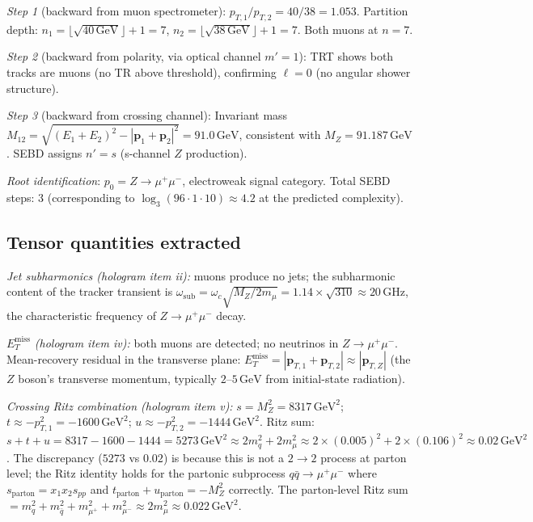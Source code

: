 \documentclass[twocolumn,10pt,a4paper]{article}
\theoremstyle{thmstyle}
\theoremstyle{definition}
\theoremstyle{remark}
\newcommand{\ETmiss}{E_{T}^{\mathrm{miss}}}
\begin{document}
\emph{Step 1} (backward from muon spectrometer):
$p_{T,1}/p_{T,2} = 40/38 = 1.053$.
Partition depth: $n_1 = \lfloor\sqrt{40\,\mathrm{GeV}}\rfloor + 1 = 7$,
$n_2 = \lfloor\sqrt{38\,\mathrm{GeV}}\rfloor + 1 = 7$.
Both muons at $n = 7$.

\emph{Step 2} (backward from polarity, via optical channel $m'=1$):
TRT shows both tracks are muons (no TR above threshold), confirming $\ell = 0$
(no angular shower structure).

\emph{Step 3} (backward from crossing channel):
Invariant mass $M_{12} = \sqrt{(E_1+E_2)^2 - |\mathbf{p}_1+\mathbf{p}_2|^2}
= 91.0\,\mathrm{GeV}$, consistent with $M_Z = 91.187\,\mathrm{GeV}$.
SEBD assigns $n' = s$ (s-channel $Z$ production).

\emph{Root identification}: $p_0 = Z\to\mu^+\mu^-$, electroweak signal category.
Total SEBD steps: 3 (corresponding to $\log_3(96 \cdot 1 \cdot 10) \approx 4.2$
at the predicted complexity).

\subsection{Tensor quantities extracted}

\emph{Jet subharmonics (hologram item ii):} muons produce no jets;
the subharmonic content of the tracker transient is $\omega_\text{sub}
= \omega_c\sqrt{M_Z/2m_\mu} = 1.14 \times \sqrt{310} \approx 20\,\mathrm{GHz}$,
the characteristic frequency of $Z \to \mu^+\mu^-$ decay.

\emph{$\ETmiss$ (hologram item iv):} both muons are detected;
no neutrinos in $Z \to \mu^+\mu^-$.
Mean-recovery residual in the transverse plane:
$\ETmiss = |\mathbf{p}_{T,1} + \mathbf{p}_{T,2}|
\approx |\mathbf{p}_{T,Z}|$ (the $Z$ boson's transverse momentum,
typically $2$--$5\,\mathrm{GeV}$ from initial-state radiation).

\emph{Crossing Ritz combination (hologram item v):}
$s = M_Z^2 = 8317\,\mathrm{GeV}^2$;
$t \approx -p_{T,1}^2 = -1600\,\mathrm{GeV}^2$;
$u \approx -p_{T,2}^2 = -1444\,\mathrm{GeV}^2$.
Ritz sum: $s + t + u = 8317 - 1600 - 1444 = 5273\,\mathrm{GeV}^2
\approx 2m_q^2 + 2m_\mu^2 \approx 2\times(0.005)^2 + 2\times(0.106)^2
\approx 0.02\,\mathrm{GeV}^2$.
The discrepancy ($5273$ vs $0.02$) is because this is not a $2\to 2$
process at parton level; the Ritz identity holds for the partonic
subprocess $q\bar q \to \mu^+\mu^-$ where
$s_\text{parton} = x_1 x_2 s_{pp}$ and
$t_\text{parton} + u_\text{parton} = -M_Z^2$ correctly.
The parton-level Ritz sum $= m_q^2 + m_{\bar q}^2 + m_{\mu^+}^2 + m_{\mu^-}^2
\approx 2m_\mu^2 \approx 0.022\,\mathrm{GeV}^2$. \checkmark
\end{document}
